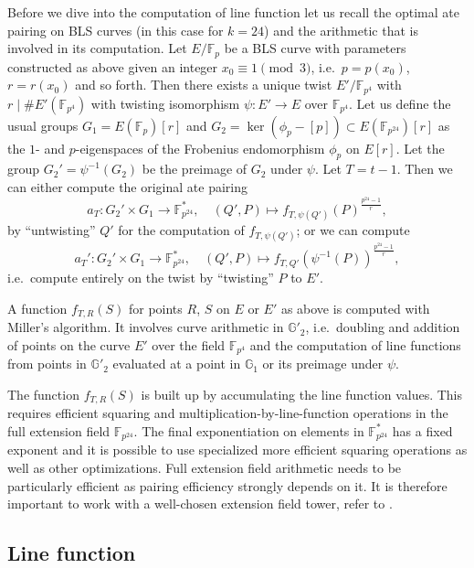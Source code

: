 Before we dive into the computation of line function let us recall the optimal ate pairing on BLS curves (in this case for $k=24$) and the arithmetic that is involved in its computation. Let $E/\mathbb{F}_p$ be a BLS curve with parameters constructed as above given an integer $x_0 \equiv 1 \pmod{3}$, i.e.\ $p = p(x_0)$, $r = r(x_0)$ and so forth. Then there exists a unique twist $E'/\mathbb{F}_{p^4}$ with $r \mid \#E'(\mathbb{F}_{p^4})$ with twisting isomorphism $\psi : E' \rightarrow E$ over $\mathbb{F}_{p^4}$. Let us define the usual groups $G_1 = E(\mathbb{F}_p)[r]$ and $G_2 = \ker(\phi_p - [p]) \subset E(\mathbb{F}_{p^{24}})[r]$ as the $1$- and $p$-eigenspaces of the Frobenius endomorphism $\phi_p$ on $E[r]$. Let the group $G_2' = \psi^{-1}(G_2)$ be the preimage of $G_2$ under $\psi$. Let $T = t - 1$. Then we can either compute the original ate pairing
$$a_T : G_2' \times G_1 \to \mathbb{F}_{p^{24}}^*, \quad (Q', P) \mapsto f_{T,\psi(Q')}(P)^{\frac{p^{24}-1}{r}},$$
by ``untwisting'' $Q'$ for the computation of $f_{T,\psi(Q')}$; or we can compute
$$a_T' : G_2' \times G_1 \to \mathbb{F}_{p^{24}}^*, \quad (Q', P) \mapsto f_{T,Q'}(\psi^{-1}(P))^{\frac{p^{24}-1}{r}},$$
i.e.\ compute entirely on the twist by ``twisting'' $P$ to $E'$.

A function $f_{T,R}(S)$ for points $R$, $S$ on $E$ or $E'$ as above is computed
with Miller's algorithm. It involves curve arithmetic in $\mathbb{G}'_2$, i.e.\
doubling and addition of points on the curve $E'$ over the field $\mathbb{F}_{p^4}$
and the computation of line functions from points in $\mathbb{G}'_2$ evaluated at
a point in $\mathbb{G}_1$ or its preimage under $\psi$.

The function $f_{T,R}(S)$ is built up by accumulating the line function values.
This requires efficient squaring and multiplication-by-line-function operations in
the full extension field $\mathbb{F}_{p^{24}}$. The final exponentiation on elements
in $\mathbb{F}^*_{p^{24}}$ has a fixed exponent and it is possible to use specialized
more efficient squaring operations as well as other optimizations. Full extension field arithmetic needs to be particularly efficient as pairing efficiency strongly depends on it. It is therefore important to work with a well-chosen extension field tower, refer to \cite{CLN11}. 


\subsection{Line function}
\label{ssec:linefunction}

